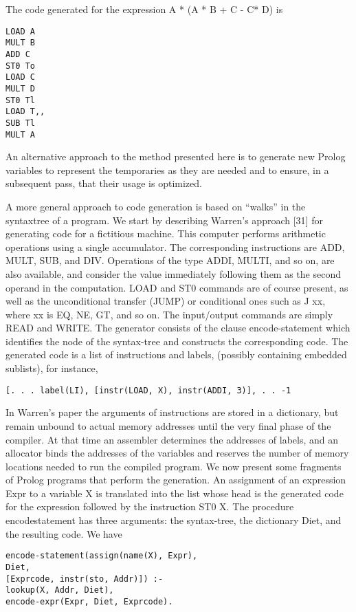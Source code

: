 The code generated for the expression A * (A * B + C - C* D) is
\begin{verbatim}
LOAD A
MULT B
ADD C
ST0 To
LOAD C
MULT D
ST0 Tl
LOAD T,,
SUB Tl
MULT A 
\end{verbatim}

An alternative approach to the method presented here is to generate new
Prolog variables to represent the temporaries as they are needed and to ensure,
in a subsequent pass, that their usage is optimized. 


A more general approach to code generation is based on “walks” in the syntaxtree
of a program. We start by describing Warren’s approach [31] for generating
code for a fictitious machine. This computer performs arithmetic operations
using a single accumulator. The corresponding instructions are ADD, MULT,
SUB, and DIV. Operations of the type ADDI, MULTI, and so on, are also
available, and consider the value immediately following them as the second
operand in the computation. LOAD and ST0 commands are of course present,
as well as the unconditional transfer (JUMP) or conditional ones such as J xx,
where xx is EQ, NE, GT, and so on. The input/output commands are simply
READ and WRITE. The generator consists of the clause encode-statement which
identifies the node of the syntax-tree and constructs the corresponding code. The
generated code is a list of instructions and labels, (possibly containing embedded
sublists), for instance,
\begin{verbatim}
[. . . label(LI), [instr(LOAD, X), instr(ADDI, 3)], . . -1 
\end{verbatim}

In Warren’s paper the arguments of instructions are stored in a dictionary,
but remain unbound to actual memory addresses until the very final phase of the
compiler. At that time an assembler determines the addresses of labels, and an
allocator binds the addresses of the variables and reserves the number of memory
locations needed to run the compiled program. We now present some fragments
of Prolog programs that perform the generation. An assignment of an expression
Expr to a variable X is translated into the list whose head is the generated code
for the expression followed by the instruction ST0 X. The procedure encodestatement
has three arguments: the syntax-tree, the dictionary Diet, and the
resulting code. We have
\begin{verbatim}
encode-statement(assign(name(X), Expr),
Diet,
[Exprcode, instr(sto, Addr)]) :-
lookup(X, Addr, Diet),
encode-expr(Expr, Diet, Exprcode). 
\end{verbatim}

